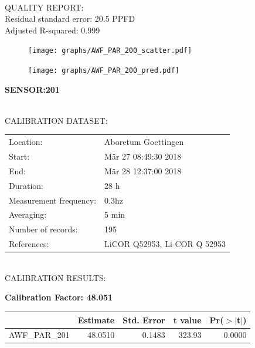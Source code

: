 \documentclass[oneside]{report}
\begin{document}
\hrulefill\\
QUALITY REPORT:\\
Residual standard error: 20.5 PPFD\\
Adjusted R-squared: 0.999



\begin{figure}[H]
  \centering
  \texttt{[image: graphs/AWF\_PAR\_200\_scatter.pdf]}
\end{figure}




\begin{figure}[H]
  \centering
  \texttt{[image: graphs/AWF\_PAR\_200\_pred.pdf]}
\end{figure}

\pagebreak


\begin{center}
\large{\textbf{SENSOR:201}}\\
\end{center}

\hrulefill\\
CALIBRATION DATASET:\\
\begin{table}[h!]
  \centering
  \label{tab:table1}
  \begin{tabular}{ll}
    Location: & Aboretum Goettingen\\ 
    
    
    Start:  & Mär 27 08:49:30 2018 \\
    End:   & Mär 28 12:37:00 2018\\ 
    Duration: & 28 h\\
    Measurement frequency: & 0.3hz\\
    Averaging:  &5 min\\
    Number of records: & 195 \\
    References: & LiCOR Q52953, Li-COR Q 52953 \\
  \end{tabular}
\end{table}

\hrulefill\\
CALIBRATION RESULTS:\\


\begin{center}
\textbf{\large{Calibration Factor: 48.051}}\\
\end{center}
\begin{table}[ht]
\centering
\begin{tabular}{rrrrr}
  \hline
 & Estimate & Std. Error & t value & Pr($>$$|$t$|$) \\ 
  \hline
AWF\_PAR\_201 & 48.0510 & 0.1483 & 323.93 & 0.0000 \\ 
   \hline
\end{tabular}
\end{table}
\end{document}
